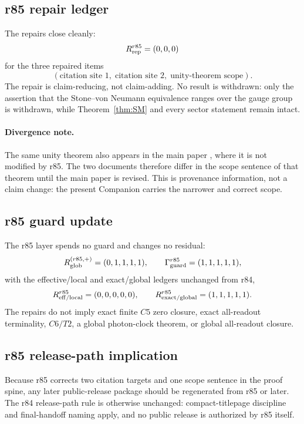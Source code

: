 \subsection*{r85 repair ledger}
\label{subsec:r85-repair-ledger}

The repairs close cleanly:
\[
R_{\rm rep}^{r85}=(0,0,0)
\]
for the three repaired items
\[
(\text{citation site 1},\;\text{citation site 2},\;\text{unity-theorem scope}).
\]
The repair is claim-reducing, not claim-adding.  No result is withdrawn: only the assertion
that the Stone--von Neumann equivalence ranges over the gauge group is withdrawn, while
Theorem~\ref{thm:SM} and every sector statement remain intact.

\paragraph{Divergence note.}
The same unity theorem also appears in the main paper \cite{brendecke2026main}, where it is
not modified by r85.  The two documents therefore differ in the scope sentence of that theorem
until the main paper is revised.  This is provenance information, not a claim change: the
present Companion carries the narrower and correct scope.

\subsection*{r85 guard update}
\label{subsec:r85-guard-update}

The r85 layer spends no guard and changes no residual:
\[
R_{\rm glob}^{(r85,+)}=(0,1,1,1,1),
\qquad
\Gamma_{\rm guard}^{r85}=(1,1,1,1,1),
\]
with the effective/local and exact/global ledgers unchanged from r84,
\[
R_{\rm eff/local}^{r85}=(0,0,0,0,0),
\qquad
R_{\rm exact/global}^{r85}=(1,1,1,1,1).
\]
The repairs do not imply exact finite \(C5\) zero closure, exact all-readout terminality,
\(C6/T2\), a global photon-clock theorem, or global all-readout closure.

\subsection*{r85 release-path implication}
\label{subsec:r85-release-path-implication}

Because r85 corrects two citation targets and one scope sentence in the proof spine, any
later public-release package should be regenerated from r85 or later.  The r84 release-path
rule is otherwise unchanged: compact-titlepage discipline and final-handoff naming apply, and
no public release is authorized by r85 itself.


